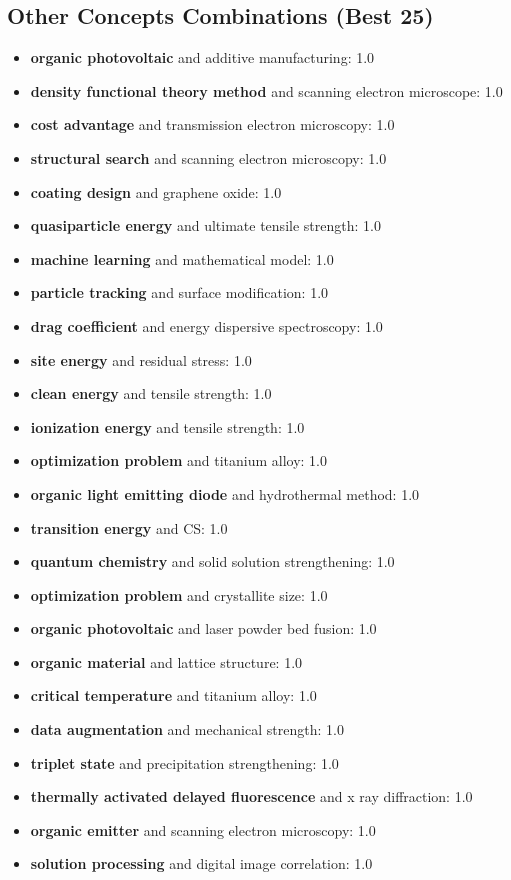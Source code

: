 \documentclass{article}%
\begin{document}
%
\subsection{Other Concepts Combinations (Best 25)}%
\label{subsec:OtherConceptsCombinations(Best25)}%
\begin{itemize}%
\item%
\textbf{organic photovoltaic} and additive manufacturing: 1.0%
\item%
\textbf{density functional theory method} and scanning electron microscope: 1.0%
\item%
\textbf{cost advantage} and transmission electron microscopy: 1.0%
\item%
\textbf{structural search} and scanning electron microscopy: 1.0%
\item%
\textbf{coating design} and graphene oxide: 1.0%
\item%
\textbf{quasiparticle energy} and ultimate tensile strength: 1.0%
\item%
\textbf{machine learning} and mathematical model: 1.0%
\item%
\textbf{particle tracking} and surface modification: 1.0%
\item%
\textbf{drag coefficient} and energy dispersive spectroscopy: 1.0%
\item%
\textbf{site energy} and residual stress: 1.0%
\item%
\textbf{clean energy} and tensile strength: 1.0%
\item%
\textbf{ionization energy} and tensile strength: 1.0%
\item%
\textbf{optimization problem} and titanium alloy: 1.0%
\item%
\textbf{organic light emitting diode} and hydrothermal method: 1.0%
\item%
\textbf{transition energy} and CS: 1.0%
\item%
\textbf{quantum chemistry} and solid solution strengthening: 1.0%
\item%
\textbf{optimization problem} and crystallite size: 1.0%
\item%
\textbf{organic photovoltaic} and laser powder bed fusion: 1.0%
\item%
\textbf{organic material} and lattice structure: 1.0%
\item%
\textbf{critical temperature} and titanium alloy: 1.0%
\item%
\textbf{data augmentation} and mechanical strength: 1.0%
\item%
\textbf{triplet state} and precipitation strengthening: 1.0%
\item%
\textbf{thermally activated delayed fluorescence} and x ray diffraction: 1.0%
\item%
\textbf{organic emitter} and scanning electron microscopy: 1.0%
\item%
\textbf{solution processing} and digital image correlation: 1.0%
\end{itemize}
\end{document}

